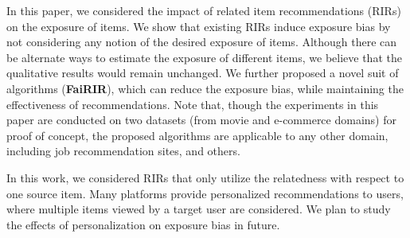 In this paper, we considered the impact of related item recommendations (RIRs)
on the exposure of items. We show that existing RIRs induce exposure bias by not considering any notion of the desired exposure of items. 
Although there can be alternate ways to estimate the exposure of different items, we believe that the qualitative results would remain unchanged. 
We further proposed a novel suit of algorithms (\textbf{FaiRIR}), which can reduce the exposure bias, while maintaining the effectiveness of recommendations. 
Note that, though the experiments in this paper are conducted on two datasets (from movie and e-commerce domains)
for proof of concept, the proposed algorithms are applicable to any other domain, including job recommendation sites, and others.

In this work, we considered RIRs that only utilize the relatedness with respect to one source item. 
Many platforms provide personalized recommendations to users, where multiple items viewed by a target user are considered. We plan to study the effects of personalization on exposure bias in future.


